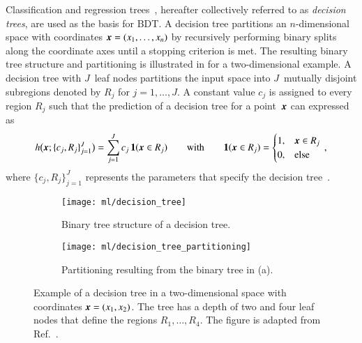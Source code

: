 Classification and regression trees~\cite{Breiman:1984jka,hastie09}, hereafter
collectively referred to as \emph{decision trees}, are used as the basis for
BDT. A decision tree partitions an $n$-dimensional space with coordinates
$\myvec{x} = (x_1, \dots, x_n)$ by recursively performing binary splits along
the coordinate axes until a stopping criterion is met. The resulting binary tree
structure and partitioning is illustrated in  for a
two-dimensional example. A decision tree with $J$~leaf nodes partitions the
input space into $J$~mutually disjoint subregions denoted by $R_j$ for
$j = 1, \dots, J$. A constant value $c_j$ is assigned to every region $R_j$ such
that the prediction of a decision tree for a point~$\myvec{x}$ can expressed as
\begin{align*}
  h\bigl( \myvec{x}; \{c_j, R_j\}_{j=1}^{J} \bigr) = \sum_{j = 1}^{J} c_j \, \mathbf{1}(\myvec{x} \in R_j) \qquad \text{with} \qquad \mathbf{1}(\myvec{x} \in R_j) =
  \begin{cases}
    1, & \myvec{x} \in R_j \\
    0, & \text{else}
  \end{cases} \,\text{,}
\end{align*}
where $\{c_j, R_j\}_{j=1}^{J}$ represents the parameters that specify the
decision tree~\cite{hastie09}.

\begin{figure}[htbp]
  \centering

  \begin{subfigure}[b]{0.46\textwidth}
    \centering
    \texttt{[image: ml/decision\_tree]}
    \caption{Binary tree structure of a decision tree.}
  \end{subfigure}\hfill%
  \begin{subfigure}[b]{0.46\textwidth}
    \centering
    \texttt{[image: ml/decision\_tree\_partitioning]}
    \vspace*{0.7em}
    \caption{Partitioning resulting from the binary tree in (a).}
  \end{subfigure}\hfill%

  \caption{Example of a decision tree in a two-dimensional space with
    coordinates $\myvec{x} = (x_1, x_2)$. The tree has a depth of two and four
    leaf nodes that define the regions $R_1, \dots, R_4$. The figure is adapted
    from Ref.~\cite{hastie09}.}%
  \label{fig:decision_tree}
\end{figure}

